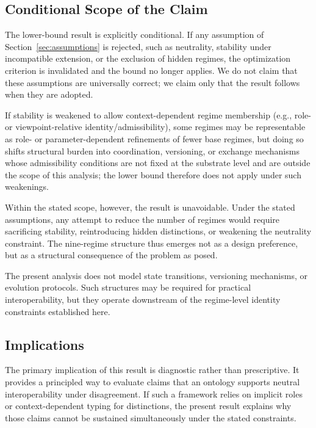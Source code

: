 \subsection{Conditional Scope of the Claim}

The lower-bound result is explicitly conditional.
If any assumption of Section~\ref{sec:assumptions} is rejected,
such as neutrality, stability under incompatible extension,
or the exclusion of hidden regimes,
the optimization criterion is invalidated
and the bound no longer applies.
We do not claim that these assumptions are universally correct;
we claim only that the result follows when they are adopted.

If stability is weakened to allow context-dependent
regime membership (e.g., role- or viewpoint-relative identity/admissibility),
some regimes may be representable as
role- or parameter-dependent refinements of fewer base regimes,
but doing so shifts structural burden into
coordination, versioning, or exchange mechanisms
whose admissibility conditions are not fixed
at the substrate level and are outside the scope of this analysis;
the lower bound therefore does not apply under such weakenings.

Within the stated scope, however, the result is unavoidable.
Under the stated assumptions, any attempt to reduce the number of regimes
would require sacrificing stability,
reintroducing hidden distinctions, or weakening the neutrality constraint.
The nine-regime structure thus emerges not as a design preference, but as a
structural consequence of the problem as posed.

The present analysis does not model state transitions,
versioning mechanisms, or evolution protocols.
Such structures may be required for practical interoperability,
but they operate downstream of the regime-level identity constraints
established here.

\subsection{Implications}

The primary implication of this result is diagnostic rather than
prescriptive.
It provides a principled way to evaluate claims that an ontology supports
neutral interoperability under disagreement.
If such a framework relies on implicit roles or context-dependent typing
for \stabilitycritical{} distinctions, the present result explains why those
claims cannot be sustained simultaneously under the stated constraints.

